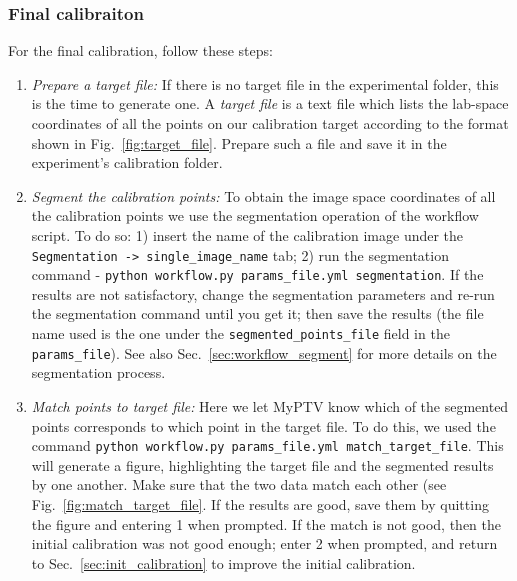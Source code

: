 \documentclass[10pt,a4paper]{article}
\begin{document}
\subsubsection{Final calibraiton}

For the final calibration, follow these steps:


\begin{enumerate}
	\item \textit{Prepare a target file:} If there is no target file in the experimental folder, this is the time to generate one. A \textit{target file} is a text file which lists the lab-space coordinates of all the points on our calibration target according to the format shown in Fig.~\ref{fig:target_file}. Prepare such a file and save it in the experiment's calibration folder.
	
	\item \textit{Segment the calibration points:} To obtain the image space coordinates of all the calibration points we use the segmentation operation of the workflow script. To do so: 1) insert the name of the calibration image under the \texttt{Segmentation -> single\_image\_name} tab; 2) run the segmentation command - \texttt{python workflow.py params\_file.yml segmentation}. If the results are not satisfactory, change the segmentation parameters and re-run the segmentation command until you get it; then save the results (the file name used is the one under the \texttt{segmented\_points\_file} field in the \texttt{params\_file}). See also Sec.~\ref{sec:workflow_segment} for more details on the segmentation process.  
	
	\item \textit{Match points to target file:} Here we let MyPTV know which of the segmented points corresponds to which point in the target file. To do this, we used the command \texttt{python workflow.py params\_file.yml match\_target\_file}. This will generate a figure, highlighting the target file and the segmented results  by one another. Make sure that the two data match each other (see Fig.~\ref{fig:match_target_file}. If the results are good, save them by quitting the figure and entering 1 when prompted. If the match is not good, then the initial calibration was not good enough; enter 2 when prompted, and return to Sec.~\ref{sec:init_calibration} to improve the initial calibration.
	

\end{enumerate}
\end{document}

